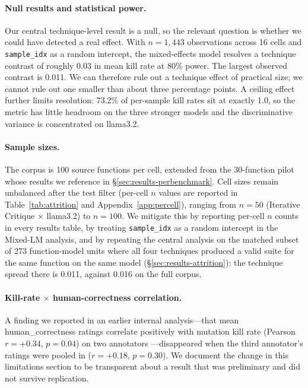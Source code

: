 \documentclass[smallextended]{svjour3}
\begin{document}
\paragraph{Null results and statistical power.}
Our central technique-level result is a null, so the relevant question
is whether we could have detected a real effect. With $n = 1{,}443$
observations across 16 cells and \texttt{sample\_idx} as a random
intercept, the mixed-effects model resolves a technique contrast of
roughly 0.03 in mean kill rate at 80\% power. The largest observed
contrast is 0.011. We can therefore rule out a technique effect of
practical size; we cannot rule out one smaller than about three
percentage points. A ceiling effect further limits resolution:
73.2\% of per-sample kill rates sit at exactly 1.0, so the metric
has little headroom on the three stronger models and the
discriminative variance is concentrated on llama3.2.

\paragraph{Sample sizes.}
The corpus is 100 source functions per cell, extended from the
30-function pilot whose results we reference in
\S\ref{sec:results-perbenchmark}. Cell sizes remain unbalanced after
the test filter (per-cell $n$ values are reported in
Table~\ref{tab:attrition} and Appendix~\ref{app:percell}),
ranging from $n = 50$ (Iterative Critique $\times$ llama3.2) to
$n = 100$. We mitigate this by reporting per-cell $n$ counts in
every results table, by treating \texttt{sample\_idx} as a random
intercept in the Mixed-LM analysis, and by repeating the central
analysis on the matched subset of 273 function-model units where all
four techniques produced a valid suite for the same function on the
same model (\S\ref{sec:results-attrition}); the technique spread there
is 0.011, against 0.016 on the full corpus.

\paragraph{Kill-rate $\times$ human-correctness correlation.}
A finding we reported in an earlier internal analysis—that mean
human\_correctness ratings correlate positively with mutation kill
rate (Pearson $r = +0.34$, $p = 0.04$) on two annotators
—disappeared when the third annotator's ratings were pooled in
($r = +0.18$, $p = 0.30$). We document the change in this
limitations section to be transparent about a result that was
preliminary and did not survive replication.
\end{document}
